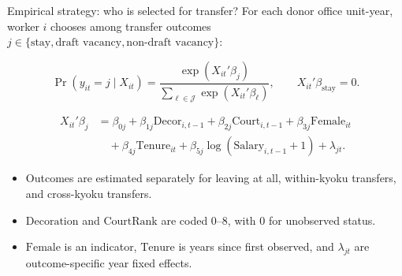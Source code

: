 \begin{frame}{Empirical strategy: who is selected for transfer?}
    \small
    For each donor office unit-year, worker $i$ chooses among transfer outcomes
    $j \in \{\text{stay},\text{draft vacancy},\text{non-draft vacancy}\}$:

    \[
    \Pr(y_{it}=j \mid X_{it}) =
    \frac{\exp\left(X_{it}'\beta_j\right)}
    {\sum_{\ell \in \mathcal{J}}\exp\left(X_{it}'\beta_\ell\right)}, \qquad
    X_{it}'\beta_{\text{stay}} = 0.
    \]

    \[
    \begin{aligned}
    X_{it}'\beta_j
    &= \beta_{0j}
    + \beta_{1j}\text{Decor}_{i,t-1}
    + \beta_{2j}\text{Court}_{i,t-1}
    + \beta_{3j}\text{Female}_{it} \\
    &\quad
    + \beta_{4j}\text{Tenure}_{it}
    + \beta_{5j}\log(\text{Salary}_{i,t-1}+1)
    + \lambda_{jt}.
    \end{aligned}
    \]

    \begin{itemize}
        \item Outcomes are estimated separately for leaving at all, within-kyoku transfers, and cross-kyoku transfers.
        \item $\text{Decoration}$ and $\text{CourtRank}$ are coded 0--8, with 0 for unobserved status.
        \item $\text{Female}$ is an indicator, $\text{Tenure}$ is years since first observed, and $\lambda_{jt}$ are outcome-specific year fixed effects.
    \end{itemize}
\end{frame}
